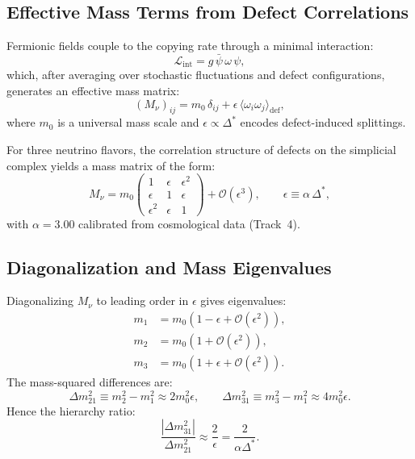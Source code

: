 \documentclass[11pt,a4paper]{article}
\newcommand{\DeltaStar}{\Delta^{\ast}}
\begin{document}
\subsection{Effective Mass Terms from Defect Correlations}
\label{subsec:mass_generation}

Fermionic fields couple to the copying rate through a minimal interaction:
\begin{equation}
\mathcal{L}_{\text{int}} = g \, \bar{\psi} \, \omega \, \psi,
\end{equation}
which, after averaging over stochastic fluctuations and defect configurations, generates an effective mass matrix:
\begin{equation}
(M_\nu)_{ij} = m_0 \, \delta_{ij} + \epsilon \, \langle \omega_i \omega_j \rangle_{\text{def}},
\end{equation}
where $m_0$ is a universal mass scale and $\epsilon \propto \DeltaStar$ encodes defect-induced splittings.

For three neutrino flavors, the correlation structure of defects on the simplicial complex yields a mass matrix of the form:
\begin{equation}
M_\nu = m_0 \begin{pmatrix}
1 & \epsilon & \epsilon^2 \\
\epsilon & 1 & \epsilon \\
\epsilon^2 & \epsilon & 1
\end{pmatrix} + \mathcal{O}(\epsilon^3),
\qquad \epsilon \equiv \alpha \, \DeltaStar,
\end{equation}
with $\alpha = 3.00$ calibrated from cosmological data (Track~4).

\subsection{Diagonalization and Mass Eigenvalues}
\label{subsec:diagonalization}

Diagonalizing $M_\nu$ to leading order in $\epsilon$ gives eigenvalues:
\begin{align}
m_1 &= m_0 \left(1 - \epsilon + \mathcal{O}(\epsilon^2)\right), \\
m_2 &= m_0 \left(1 + \mathcal{O}(\epsilon^2)\right), \\
m_3 &= m_0 \left(1 + \epsilon + \mathcal{O}(\epsilon^2)\right).
\end{align}
The mass-squared differences are:
\begin{equation}
\Delta m^2_{21} \equiv m_2^2 - m_1^2 \approx 2 m_0^2 \epsilon, \qquad
\Delta m^2_{31} \equiv m_3^2 - m_1^2 \approx 4 m_0^2 \epsilon.
\end{equation}
Hence the hierarchy ratio:
\begin{equation}
\frac{|\Delta m^2_{31}|}{\Delta m^2_{21}} \approx \frac{2}{\epsilon} = \frac{2}{\alpha \DeltaStar}.
\label{eq:hierarchy_ratio}
\end{equation}
\end{document}
